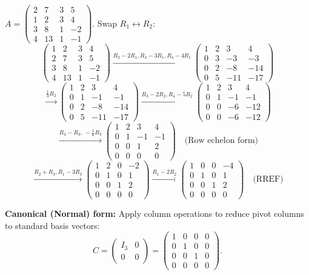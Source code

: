 \documentclass[12pt,a3paper]{article}
\begin{document}
\begin{tcolorbox}
$A = \begin{pmatrix}2&7&3&5\\1&2&3&4\\3&8&1&-2\\4&13&1&-1\end{pmatrix}$. Swap $R_1\leftrightarrow R_2$:
\[
\begin{pmatrix}1&2&3&4\\2&7&3&5\\3&8&1&-2\\4&13&1&-1\end{pmatrix}
\xrightarrow{R_2-2R_1,R_3-3R_1,R_4-4R_1}
\begin{pmatrix}1&2&3&4\\0&3&-3&-3\\0&2&-8&-14\\0&5&-11&-17\end{pmatrix}
\]
\[
\xrightarrow{\frac{1}{3}R_2}
\begin{pmatrix}1&2&3&4\\0&1&-1&-1\\0&2&-8&-14\\0&5&-11&-17\end{pmatrix}
\xrightarrow{R_3-2R_2,R_4-5R_2}
\begin{pmatrix}1&2&3&4\\0&1&-1&-1\\0&0&-6&-12\\0&0&-6&-12\end{pmatrix}
\]
\[
\xrightarrow{R_4-R_3,\,-\frac{1}{6}R_3}
\begin{pmatrix}1&2&3&4\\0&1&-1&-1\\0&0&1&2\\0&0&0&0\end{pmatrix} \quad\text{(Row echelon form)}
\]
\[
\xrightarrow{R_2+R_3,R_1-3R_3}
\begin{pmatrix}1&2&0&-2\\0&1&0&1\\0&0&1&2\\0&0&0&0\end{pmatrix}
\xrightarrow{R_1-2R_2}
\begin{pmatrix}1&0&0&-4\\0&1&0&1\\0&0&1&2\\0&0&0&0\end{pmatrix} \quad\text{(RREF)}
\]
 
\textbf{Canonical (Normal) form:} Apply column operations to reduce pivot columns to standard basis vectors:
\[
C = \begin{pmatrix}I_3 & 0 \\ 0 & 0\end{pmatrix} = \begin{pmatrix}1&0&0&0\\0&1&0&0\\0&0&1&0\\0&0&0&0\end{pmatrix}.
\]
 

\end{tcolorbox}
\end{document}
